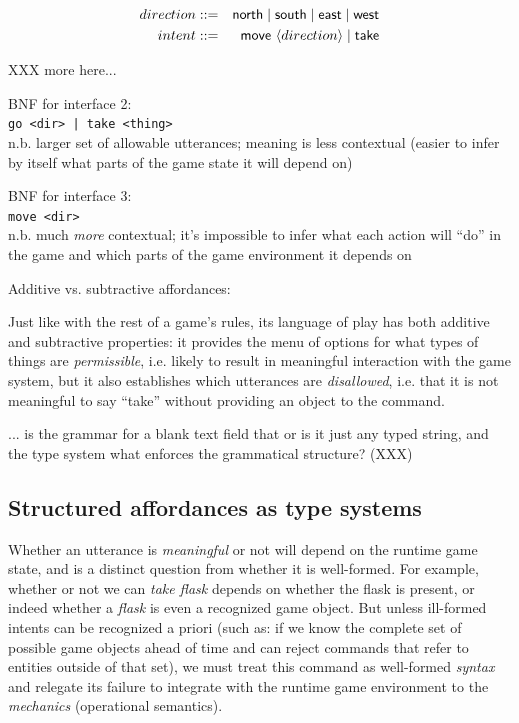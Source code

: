   \begin{eqnarray*}
  direction &::=& \mathsf{north} \mid \mathsf{south} \mid \mathsf{east}
    \mid \mathsf{west} \\
  intent &::=& \mathsf{move}\  \langle direction \rangle \mid \mathsf{take}
  \end{eqnarray*}

  XXX more here...

  BNF for interface 2:\\
  \verb/go <dir> | take <thing>/\\
  n.b. larger set of allowable utterances; meaning is less contextual
  (easier to infer by itself what parts of the game state it will depend
  on)

  BNF for interface 3:\\
  \verb/move <dir>/\\
  n.b. much {\em more} contextual; it's impossible to infer what each
  action will ``do'' in the game and which parts of the game environment it
  depends on

  Additive vs. subtractive affordances:

  Just like with the rest of a game's rules, its language of play has both
  additive and subtractive properties: it provides the menu of options for
  what types of things are {\em permissible}, i.e. likely to result in
  meaningful interaction with the game system, but it also establishes
  which utterances are {\em disallowed}, i.e. that it is not meaningful to
  say ``take'' without providing an object to the command.

  ... is the grammar for a blank text field that or is it just any typed
  string, and the type system what enforces the grammatical structure?
  (XXX)

  \subsection{Structured affordances as type systems}
  
  Whether an utterance is {\em meaningful} or not will depend on
  the runtime game state, and is a distinct question from whether it is
  well-formed. For example, whether or not we can {\em take
  flask} depends on whether the flask is present, or indeed whether a {\em
  flask} is even a recognized game object. But unless ill-formed intents can be
  recognized a priori (such as: if we know the complete set of possible
  game objects ahead of time and can reject commands that refer to entities
  outside of that set), we must treat this command as well-formed {\em
  syntax} and relegate its failure to integrate with the runtime game
  environment to the {\em mechanics} (operational semantics).

